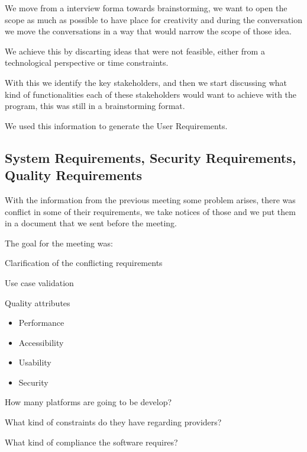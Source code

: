 \noindent We move from a interview forma towards brainstorming, we want to open 
the scope as much as possible to have place for creativity and during 
the conversation we move the conversations in a way that would narrow the scope 
of those idea.\newline

\noindent We achieve this by discarting ideas that were not feasible, 
either from a technological perspective or time constraints.

\pagebreak

\noindent With this we identify the key stakeholders, and then we start 
discussing what kind of functionalities each of these stakeholders would want 
to achieve with the program, this was still in a brainstorming format. \newline

\noindent We used this information to generate the User Requirements.

\subsection{System Requirements, Security Requirements, Quality Requirements}
With the information from the previous meeting some problem arises, there was 
conflict in some of their requirements, we take notices of those and we put 
them in a document that we sent before the meeting. \newline

\noindent The goal for the meeting was:
\begin{packed_enum}
    \item Clarification of the conflicting requirements
    \item Use case validation
    \item Quality attributes
    \begin{itemize}
        \item Performance
        \item Accessibility 
        \item Usability
        \item Security
    \end{itemize}
    \item How many platforms are going to be develop?
    \item What kind of constraints do they have regarding providers?
    \item What kind of compliance the software requires?
\end{packed_enum}

